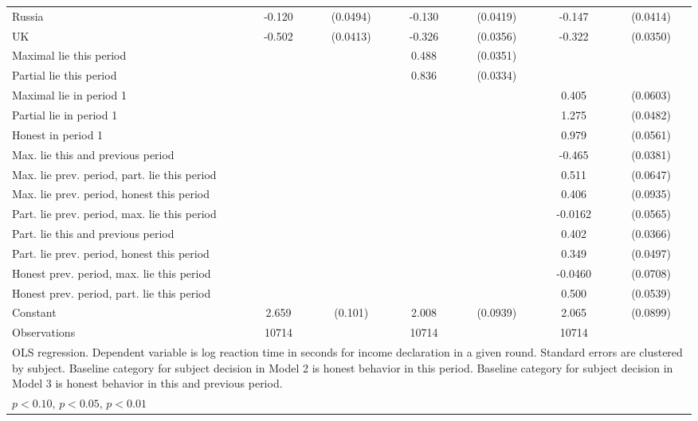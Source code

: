 {\begin{tabular}{l*{3}{cc}}
Russia          &   -0.120\sym{**} & (0.0494)&   -0.130\sym{***}& (0.0419)&   -0.147\sym{***}& (0.0414)\\
UK              &   -0.502\sym{***}& (0.0413)&   -0.326\sym{***}& (0.0356)&   -0.322\sym{***}& (0.0350)\\
Maximal lie this period&                  &         &    0.488\sym{***}& (0.0351)&                  &         \\
Partial lie this period&                  &         &    0.836\sym{***}& (0.0334)&                  &         \\
Maximal lie in period 1&                  &         &                  &         &    0.405\sym{***}& (0.0603)\\
Partial lie in period 1&                  &         &                  &         &    1.275\sym{***}& (0.0482)\\
Honest in period 1&                  &         &                  &         &    0.979\sym{***}& (0.0561)\\
Max. lie this and previous period&                  &         &                  &         &   -0.465\sym{***}& (0.0381)\\
Max. lie prev. period, part. lie this period&                  &         &                  &         &    0.511\sym{***}& (0.0647)\\
Max. lie prev. period, honest this period&                  &         &                  &         &    0.406\sym{***}& (0.0935)\\
Part. lie prev. period, max. lie this period&                  &         &                  &         &  -0.0162         & (0.0565)\\
Part. lie this and previous period&                  &         &                  &         &    0.402\sym{***}& (0.0366)\\
Part. lie prev. period, honest this period&                  &         &                  &         &    0.349\sym{***}& (0.0497)\\
Honest prev. period, max. lie this period&                  &         &                  &         &  -0.0460         & (0.0708)\\
Honest prev. period, part. lie this period&                  &         &                  &         &    0.500\sym{***}& (0.0539)\\
Constant        &    2.659\sym{***}&  (0.101)&    2.008\sym{***}& (0.0939)&    2.065\sym{***}& (0.0899)\\
\hline
Observations    &    10714         &         &    10714         &         &    10714         &         \\
\hline\hline
\multicolumn{7}{p{15cm}}{\tiny OLS regression. Dependent variable is log reaction time in seconds for income declaration in a given round. Standard errors are clustered by subject. Baseline category for subject decision in Model 2 is honest behavior in this period. Baseline category for subject decision in Model 3 is honest behavior in this and previous period.}\\
\multicolumn{7}{l}{\footnotesize \sym{*} \(p<0.10\), \sym{**} \(p<0.05\), \sym{***} \(p<0.01\)}\\
\end{tabular}
}
